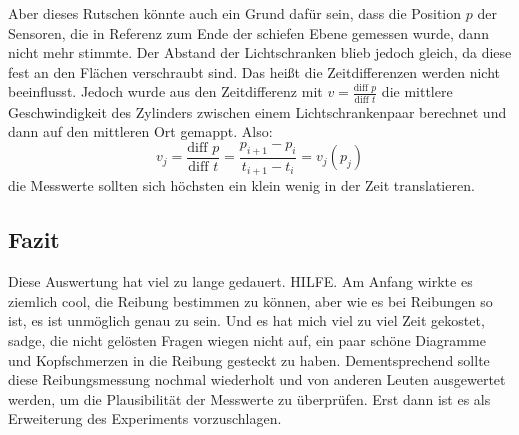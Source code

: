 Aber dieses Rutschen könnte auch ein Grund dafür sein, dass die Position \(p\) der Sensoren, die in Referenz zum Ende der schiefen Ebene gemessen wurde, dann nicht mehr stimmte. Der Abstand der Lichtschranken blieb jedoch gleich, da diese fest an den Flächen verschraubt sind. Das heißt die Zeitdifferenzen werden nicht beeinflusst. Jedoch wurde aus den Zeitdifferenz mit \(v=\frac{\text{diff }p}{\text{diff }t}\) die mittlere Geschwindigkeit des Zylinders zwischen einem Lichtschrankenpaar berechnet und dann auf den mittleren Ort gemappt. Also: 
\begin{equation}
    v_j=\frac{\text{diff }p}{\text{diff }t}=\frac{p_{i+1}-p_i}{t_{i+1}-t_i}=v_j(p_j)
\end{equation}
die Messwerte sollten sich höchsten ein klein wenig in der Zeit translatieren.  

\subsection{Fazit}
Diese Auswertung hat viel zu lange gedauert. HILFE. Am Anfang wirkte es ziemlich cool, die Reibung bestimmen zu können, aber wie es bei Reibungen so ist, es ist unmöglich genau zu sein. Und es hat mich viel zu viel Zeit gekostet, sadge, die nicht gelösten Fragen wiegen nicht auf, ein paar schöne Diagramme und Kopfschmerzen in die Reibung gesteckt zu haben. Dementsprechend sollte diese Reibungsmessung nochmal wiederholt und von anderen Leuten ausgewertet werden, um die Plausibilität der Messwerte zu überprüfen. Erst dann ist es als Erweiterung des Experiments vorzuschlagen.

